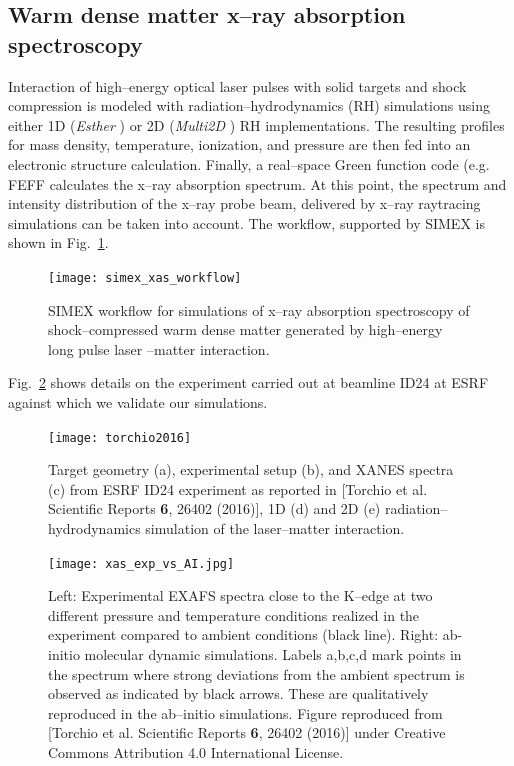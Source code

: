 \documentclass[10pt]{scrartcl}
\begin{document}
\subsection{Warm dense matter x--ray absorption spectroscopy\label{sec:warm_dense_matter_spectroscopy}}
Interaction of high--energy optical laser pulses with solid targets and shock
compression is modeled with radiation--hydrodynamics (RH) simulations using
either 1D (\textit{Esther} \cite{Colombier2005})
or 2D (\textit{Multi2D} \cite{Ramis2009}) RH implementations.
The resulting profiles for mass density, temperature,
ionization, and pressure are then fed into an electronic structure calculation.
Finally, a real--space Green function code (e.g. FEFF \cite{Rehr2009} calculates the x--ray absorption
spectrum. At this point, the spectrum and intensity distribution of the x--ray
probe beam, delivered by x--ray raytracing simulations can be taken into
account. The workflow, supported by SIMEX is shown in
Fig.~\ref{fig:xas_workflow}.
%
\begin{figure}[ht]
  \begin{center}
    \texttt{[image: simex\_xas\_workflow]}
  \end{center}
  \caption{SIMEX workflow for simulations of x--ray absorption spectroscopy of
  shock--compressed warm dense matter generated by high--energy long pulse laser
--matter interaction.}
  \label{fig:xas_workflow}
\end{figure}
%
Fig.~\ref{fig:xas_setup_rh} shows details on the experiment carried out at
beamline ID24 at ESRF against which we validate our simulations.
%
\begin{figure}[ht]
  \begin{center}
    \texttt{[image: torchio2016]}
  \end{center}
  \caption{Target geometry (a), experimental setup (b), and XANES spectra (c)
    from ESRF ID24 experiment as reported in [Torchio et al. Scientific Reports \textbf{6}, 26402
    (2016)], 1D
  (d) and 2D (e) radiation--hydrodynamics simulation of the laser--matter
interaction.}
  \label{fig:xas_setup_rh}
\end{figure}
%
\begin{figure}[ht]
  \begin{center}
    \texttt{[image: xas\_exp\_vs\_AI.jpg]}
  \end{center}
  \caption{Left: Experimental EXAFS spectra close to the K--edge at two different pressure and temperature conditions realized
    in the experiment compared to ambient conditions (black line). Right: ab-initio
  molecular dynamic simulations. Labels a,b,c,d mark points in the spectrum where
  strong deviations from the ambient spectrum is observed as indicated by black
  arrows. These are
  qualitatively reproduced in the ab--initio simulations.
  Figure reproduced from [Torchio et al. Scientific Reports \textbf{6}, 26402
    (2016)] under Creative Commons Attribution 4.0 International License.}
  \label{fig:xas_exp_vs_AI}
\end{figure}
\end{document}
